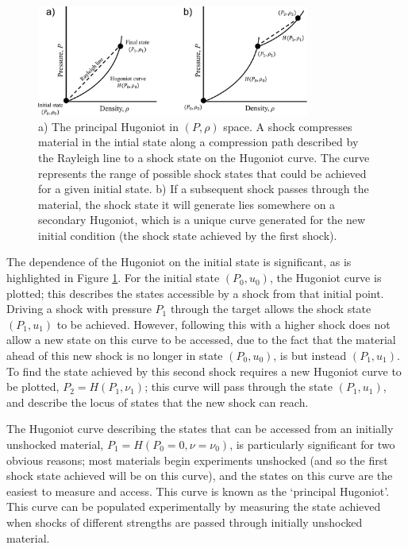 \begin{figure}
\centering
\includegraphics[width=0.8\textwidth]{figures/Theory/SecondaryHugoniot.pdf}%
\caption{\label{fig:SecondaryHugoniot} a) The principal Hugoniot in $(P, \rho)$ space. A shock compresses material in the intial state along a compression path described by the Rayleigh line to a shock state on the Hugoniot curve. The curve represents the range of possible shock states that could be achieved for a given initial state. b) If a subsequent shock passes through the material, the shock state it will generate lies somewhere on a secondary Hugoniot, which is a unique curve generated for the new initial condition (the shock state achieved by the first shock).}
\end{figure}

The dependence of the Hugoniot on the initial state is significant, as is highlighted in Figure \ref{fig:SecondaryHugoniot}. For the initial state $(P_0, u_0)$, the Hugoniot curve is plotted; this describes the states accessible by a shock from that initial point. Driving a shock with pressure $P_1$ through the target allows the shock state $(P_1, u_1)$ to be achieved. However, following this with a higher shock does not allow a new state on this curve to be accessed, due to the fact that the material ahead of this new shock is no longer in state $(P_0, u_0)$, is but instead $(P_1, u_1)$. To find the state achieved by this second shock requires a new Hugoniot curve to be plotted, $P_2 = H(P_1, \nu_1)$; this curve will pass through the state $(P_1, u_1)$, and describe the locus of states that the new shock can reach.

The Hugoniot curve describing the states that can be accessed from an initially unshocked material, $P_1 = H(P_0 = 0, \nu=\nu_0)$, is particularly significant for two obvious reasons; most materials begin experiments unshocked (and so the first shock state achieved will be on this curve), and the states on this curve are the easiest to measure and access. This curve is known as the `principal Hugoniot'. This curve can be populated experimentally by measuring the state achieved when shocks of different strengths are passed through initially unshocked material.


